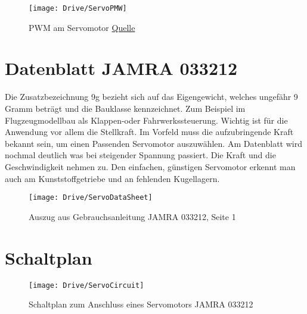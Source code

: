 \begin{description}
  \begin{figure}
    \begin{center}
        \texttt{[image: Drive/ServoPMW]}
        \caption{PWM am Servomotor \href{https://howtomechatronics.com/wp-content/uploads/2018/03/RC-Servo-Motor-Control-Signal-768x485.png?ezimgfmt=ng:webp/ngcb2}{Quelle}}
    \end{center}
  \end{figure}

\end{description}


\section{Datenblatt JAMRA 033212} 

Die Zusatzbezeichnung 9g bezieht sich auf das Eigengewicht, welches ungefähr 9 Gramm beträgt und die Bauklasse kennzeichnet. Zum Beispiel im Flugzeugmodellbau als Klappen-oder Fahrwerkssteuerung. Wichtig ist für die Anwendung vor allem die Stellkraft. Im Vorfeld muss die aufzubringende Kraft bekannt sein, um einen Passenden Servomotor auszuwählen. Am Datenblatt wird nochmal deutlich was bei steigender Spannung passiert. Die Kraft und die Geschwindigkeit nehmen zu. Den einfachen, günstigen Servomotor erkennt man auch am Kunststoffgetriebe und an fehlenden Kugellagern.

\begin{figure}
  \begin{center}
    \texttt{[image: Drive/ServoDataSheet]}
    \caption{Auszug aus Gebrauchsanleitung JAMRA 033212, Seite 1 \cite{Jamara:2018}}
  \end{center}
\end{figure}



\section{Schaltplan}

\begin{figure}
    \begin{center} 
        \texttt{[image: Drive/ServoCircuit]}
        \caption{Schaltplan zum Anschluss eines Servomotors JAMRA 033212}
    \end{center} 
\end{figure}
